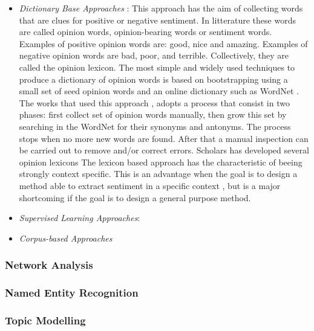 \documentclass[]{book}
\begin{document}
\begin{itemize}
\item
  \emph{Dictionary Base Approaches} : This approach has the aim of
  collecting words that are clues for positive or negative sentiment. In
  litterature these words are called opinion words, opinion-bearing
  words or sentiment words. Examples of positive opinion words are:
  good, nice and amazing. Examples of negative opinion words are bad,
  poor, and terrible. Collectively, they are called the opinion lexicon.
  The most simple and widely used techniques to produce a dictionary of
  opinion words is based on bootstrapping using a small set of seed
  opinion words and an online dictionary such as WordNet
  \citep{miller1995wordnet}. The works that used this approach
  \citep[\citet{kim2004determining}]{hu2004mining}, adopts a process
  that consist in two phases: first collect set of opinion words
  manually, then grow this set by searching in the WordNet for their
  synonyms and antonyms. The process stops when no more new words are
  found. After that a manual inspection can be carried out to remove
  and/or correct errors. Scholars has developed several opinion lexicons
  \citep[\citet{baccianella2010sentiwordnet}, \citet{hu2004mining},
  \citet{philip1966general},
  \citet{wiebe1999development}]{ding2008holistic} The lexicon based
  approach has the characteristic of beeing strongly context specific.
  This is an advantage when the goal is to design a method able to
  extract sentiment in a specific context \citep{chiarello2017product},
  but is a major shortcoming if the goal is to design a general purpose
  method.
\item
  \emph{Supervised Learning Approaches}:
\item
  \emph{Corpus-based Approaches}
\end{itemize}

\subsubsection{Network Analysis}\label{sotatoolsmodelnetanal}

\subsubsection{Named Entity Recognition}\label{sotatoolsmodelner}

\subsubsection{Topic Modelling}\label{sotatoolsmodeltopicmodel}
\end{document}
